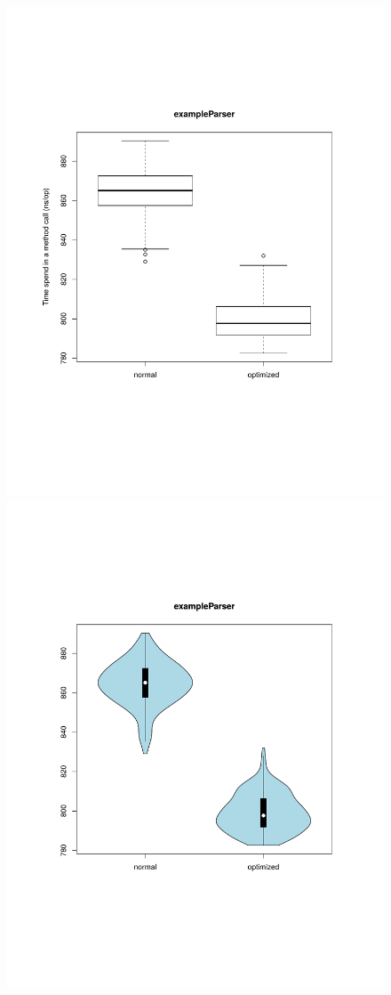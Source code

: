 \begin{figure}[H]
	\centering
	\centerline{
		\includegraphics[trim=0mm 60mm 20mm 50mm,scale=0.50]{pictures/boxplot_exampleParser.pdf}
		\includegraphics[trim=20mm 60mm 0mm 50mm,scale=0.50]{pictures/vioplot_exampleParser.pdf}
}
\end{figure}
